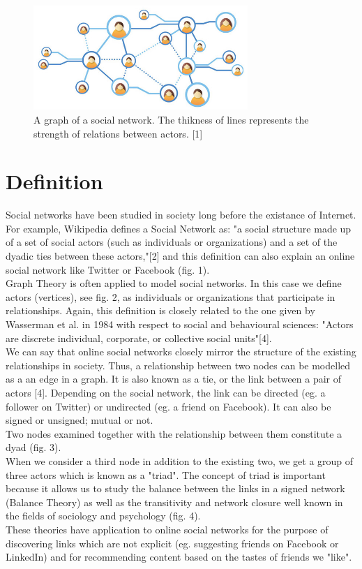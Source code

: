 \documentclass[conference,letterpaper]{IEEEtran}
\begin{document}
\begin{center}
\begin{figure}[hb]
\centering
\includegraphics[width=3.2in]{social-network-grid}
\caption{
A graph of a social network. The thikness of lines represents the strength of relations between actors. [1]
}
\label{fig_sim}
\end{figure}
\end{center}

\section{Definition}

\indent
Social networks have been studied in society long before the existance of Internet. For example, Wikipedia defines a Social Network as: "a social structure made up of a set of social actors (such as
individuals or organizations) and a set of the dyadic ties between these actors,"[2] and this definition can also explain an online social network like Twitter or Facebook (fig. 1).\\
Graph Theory is often applied to model social networks. In this case we define actors (vertices), see fig. 2,  as individuals or organizations that participate in relationships. Again, this definition is closely related to the one given by Wasserman et al. in 1984 with respect to social and behavioural sciences: "Actors are discrete individual, corporate, or collective social units"[4]. \\
We can say that online social networks closely mirror the structure of the existing relationships in society. Thus, a relationship between two nodes can be modelled as a an edge in a graph. It is also known as a tie, or the link between a pair of actors [4]. Depending on the social network, the link can be directed (eg. a follower on Twitter) or undirected (eg. a friend on Facebook). It can also be signed or unsigned; mutual or not. \\
Two nodes examined together with the relationship between them constitute a dyad (fig. 3). \\
When we consider a third node in addition to the existing two, we get a group of three actors which is known as a "triad". The concept of triad is important because it allows us to study the balance between the links in a signed network (Balance Theory) as well as the transitivity and network closure well known in the fields of sociology and psychology (fig. 4).\\
These theories have application to online social networks for the purpose of discovering links which are not explicit (eg. suggesting friends on Facebook or LinkedIn) and for recommending content based on the tastes of friends we "like".\\
\end{document}
